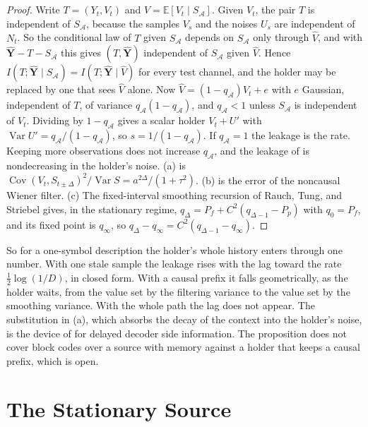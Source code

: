 \documentclass[11pt,onecolumn]{IEEEtran}
\newcommand{\E}{\mathbb{E}}
\newcommand{\Cov}{\operatorname{Cov}}
\newcommand{\Var}{\operatorname{Var}}
\newcommand{\hY}{\hat{\mathbf Y}}
\begin{document}
\begin{proof}
Write $T=(Y_t,V_t)$ and $\hat V=\E[V_t\mid S_{\mathcal A}]$. Given $V_t$,
the pair $T$ is independent of $S_{\mathcal A}$, because the samples
$V_s$ and the noises $U_s$ are independent of $N_t$. So the conditional
law of $T$ given $S_{\mathcal A}$ depends on $S_{\mathcal A}$ only through
$\hat V$, and with $\hY-T-S_{\mathcal A}$ this gives
$(T,\hY)$ independent of $S_{\mathcal A}$ given $\hat V$. Hence
$I(T;\hY\mid S_{\mathcal A})=I(T;\hY\mid\hat V)$ for every test channel,
and the holder may be replaced by one that sees $\hat V$ alone. Now
$\hat V=(1-q_{\mathcal A})V_t+e$ with $e$ Gaussian, independent of $T$,
of variance $q_{\mathcal A}(1-q_{\mathcal A})$, and $q_{\mathcal A}<1$
unless $S_{\mathcal A}$ is independent of $V_t$. Dividing by
$1-q_{\mathcal A}$ gives a scalar holder $V_t+U'$ with
$\Var U'=q_{\mathcal A}/(1-q_{\mathcal A})$, so
$s=1/(1-q_{\mathcal A})$. If $q_{\mathcal A}=1$ the leakage is the rate.
Keeping more observations does not increase $q_{\mathcal A}$, and the
leakage of \cite[Corollary~17]{part1} is nondecreasing in the holder's
noise. (a) is $\Cov(V_t,S_{t\pm\Delta})^2/\Var S=a^{2\Delta}/(1+\tau^2)$.
(b) is the error of the noncausal Wiener filter. (c) The fixed-interval
smoothing recursion of Rauch, Tung, and Striebel \cite{rts1965} gives,
in the stationary regime,
$q_\Delta=P_f+C^2(q_{\Delta-1}-P_p)$ with $q_0=P_f$, and its fixed point
is $q_\infty$, so $q_\Delta-q_\infty=C^2(q_{\Delta-1}-q_\infty)$.
\end{proof}

So for a one-symbol description the holder's whole history enters
through one number. With one stale sample the leakage rises with the
lag toward the rate $\tfrac12\log(1/D)$, in closed form. With a causal
prefix it falls geometrically, as the holder waits, from the value set
by the filtering variance to the value set by the smoothing variance.
With the whole path the lag does not appear. The substitution in (a),
which absorbs the decay of the context into the holder's noise, is the
device of \cite[eq.~(49)]{simeone2013} for delayed decoder side
information. The proposition does not cover block codes over a source
with memory against a holder that keeps a causal prefix, which is open.

\section{The Stationary Source}
\label{sec:windows}
\end{document}
